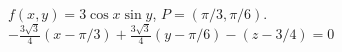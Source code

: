 {$f(x,y) = 3\cos x\sin y$,   $P=(\pi/3, \pi/6)$.
}
{
$-\frac{3\sqrt{3}}4(x-\pi/3)+\frac{3\sqrt{3}}4(y-\pi/6) - (z-3/4) = 0$
}